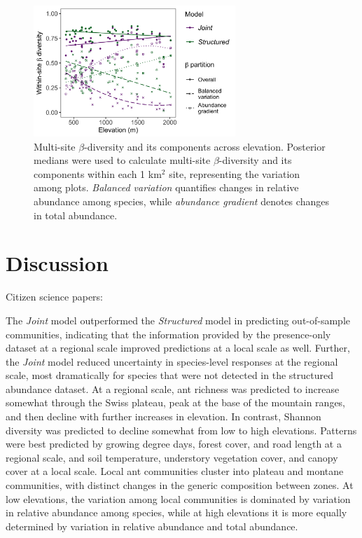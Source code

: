 \documentclass[preprint,review,times,12pt,3p]{elsarticle}
\begin{document}
\begin{figure}
\centering\includegraphics[width=3in]{../../../ms/1_Ecography/1/figs/beta_diversity.png}
\caption{\label{fig:beta_div} Multi-site $\beta$-diversity and its components across elevation. Posterior medians were used to calculate multi-site $\beta$-diversity and its components within each 1 km$^2$ site, representing the variation among plots. \emph{Balanced variation} quantifies changes in relative abundance among species, while \emph{abundance gradient} denotes changes in total abundance.}
\end{figure}


 




\section{Discussion}
\label{S:4}
Citizen science papers: \citep{Altwegg2019, Pernat2020, Henckel2020, Duan2020, Johnston2020,Robinson2020, Beck2010, Poisson2020}

The \emph{Joint} model outperformed the \emph{Structured} model in predicting out-of-sample communities, indicating that the information provided by the presence-only dataset at a regional scale improved predictions at a local scale as well. Further, the \emph{Joint} model reduced uncertainty in species-level responses at the regional scale, most dramatically for species that were not detected in the structured abundance dataset. At a regional scale, ant richness was predicted to increase somewhat through the Swiss plateau, peak at the base of the mountain ranges, and then decline with further increases in elevation. In contrast, Shannon diversity was predicted to decline somewhat from low to high elevations. Patterns were best predicted by growing degree days, forest cover, and road length at a regional scale, and soil temperature, understory vegetation cover, and canopy cover at a local scale. Local ant communities cluster into plateau and montane communities, with distinct changes in the generic composition between zones. At low elevations, the variation among local communities is dominated by variation in relative abundance among species, while at high elevations it is more equally determined by variation in relative abundance and total abundance.
\end{document}
